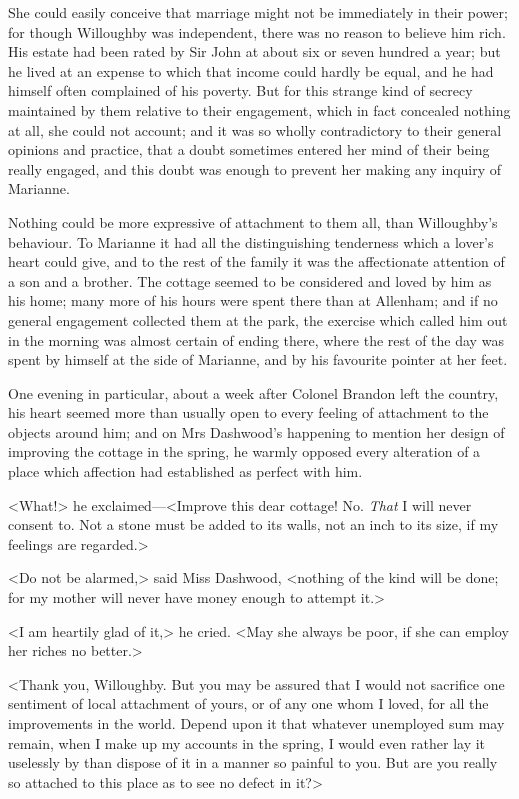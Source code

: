 She could easily conceive that marriage might not be immediately in their power; for though Willoughby was independent, there was no reason to believe him rich. His estate had been rated by Sir John at about six or seven hundred a year; but he lived at an expense to which that income could hardly be equal, and he had himself often complained of his poverty. But for this strange kind of secrecy maintained by them relative to their engagement, which in fact concealed nothing at all, she could not account; and it was so wholly contradictory to their general opinions and practice, that a doubt sometimes entered her mind of their being really engaged, and this doubt was enough to prevent her making any inquiry of Marianne.

Nothing could be more expressive of attachment to them all, than Willoughby's behaviour. To Marianne it had all the distinguishing tenderness which a lover's heart could give, and to the rest of the family it was the affectionate attention of a son and a brother. The cottage seemed to be considered and loved by him as his home; many more of his hours were spent there than at Allenham; and if no general engagement collected them at the park, the exercise which called him out in the morning was almost certain of ending there, where the rest of the day was spent by himself at the side of Marianne, and by his favourite pointer at her feet.

One evening in particular, about a week after Colonel Brandon left the country, his heart seemed more than usually open to every feeling of attachment to the objects around him; and on Mrs Dashwood's happening to mention her design of improving the cottage in the spring, he warmly opposed every alteration of a place which affection had established as perfect with him.

<What!> he exclaimed—<Improve this dear cottage! No. \textit{That} I will never consent to. Not a stone must be added to its walls, not an inch to its size, if my feelings are regarded.>

<Do not be alarmed,> said Miss Dashwood, <nothing of the kind will be done; for my mother will never have money enough to attempt it.>

<I am heartily glad of it,> he cried. <May she always be poor, if she can employ her riches no better.>

<Thank you, Willoughby. But you may be assured that I would not sacrifice one sentiment of local attachment of yours, or of any one whom I loved, for all the improvements in the world. Depend upon it that whatever unemployed sum may remain, when I make up my accounts in the spring, I would even rather lay it uselessly by than dispose of it in a manner so painful to you. But are you really so attached to this place as to see no defect in it?>


